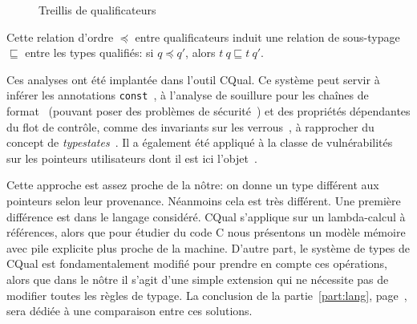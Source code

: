 \begin{figure}[h]
\centering
{}

\caption{Treillis de qualificateurs}
\label{fig:cqual-treillis}
\end{figure}

Cette relation d'ordre $\preceq$ entre qualificateurs induit une relation de
sous-typage $\sqsubseteq$ entre les types qualifiés: si $q \preceq q'$, alors
$t~q \sqsubseteq t~q'$.

Ces analyses ont été implantée dans l'outil CQual. Ce système peut servir à
inférer les annotations \texttt{const}~\cite{pldi99}, à l'analyse de souillure
pour les chaînes de format~\cite{usenix01} (pouvant poser des problèmes de
sécurité~\cite{format-string-attacks}) et des propriétés dépendantes du flot de
contrôle, comme des invariants sur les verrous~\cite{pldi02}, à rapprocher du
concept de \emph{typestates}~\cite{tse12-typestate}. Il a également été appliqué
à la classe de vulnérabilités sur les pointeurs utilisateurs dont il est ici
l'objet~\cite{cquk-usenix04}.

Cette approche est assez proche de la nôtre: on donne un type différent aux
pointeurs selon leur provenance. Néanmoins cela est très différent. Une première
différence est dans le langage considéré. CQual s'applique sur un lambda-calcul
à références, alors que pour étudier du code C nous présentons un modèle mémoire
avec pile explicite plus proche de la machine. D'autre part, le système de types
de CQual est fondamentalement modifié pour prendre en compte ces opérations,
alors que dans le nôtre il s'agit d'une simple extension qui ne nécessite pas de
modifier toutes les règles de typage. La conclusion de la
partie~\ref{part:lang}, page~\pageref{cha:ccl2}, sera dédiée à une comparaison
entre ces solutions.

